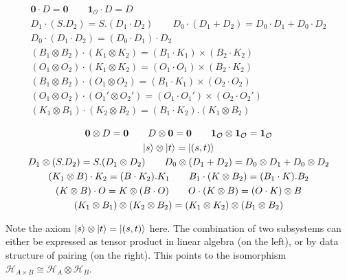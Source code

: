 \documentclass[manuscript, review, timestamp]{acmart}
\begin{document}
\begin{definition}
  \begin{gather*}
      \textbf{0} \cdot D = \textbf{0}
      \qquad
      \textbf{1}_\mathcal{O} \cdot D = D \\
      D_1 \cdot (S.D_2) = S.(D_1 \cdot D_2)
      \qquad
      D_0 \cdot (D_1 + D_2) = D_0 \cdot D_1 + D_0 \cdot D_2 \\
      D_0 \cdot (D_1 \cdot D_2) = (D_0 \cdot D_1) \cdot D_2 \\
      (B_1 \otimes B_2) \cdot (K_1 \otimes K_2) = (B_1 \cdot K_1) \times (B_2 \cdot K_2) \\
      (O_1 \otimes O_2) \cdot (K_1 \otimes K_2) = (O_1 \cdot O_1) \times (B_2 \cdot K_2) \\
      (B_1 \otimes B_2) \cdot (O_1 \otimes O_2) = (B_1 \cdot K_1) \times (O_2 \cdot O_2) \\
      (O_1 \otimes O_2) \cdot (O_1' \otimes O_2') = (O_1 \cdot O_1') \times (O_2 \cdot O_2') \\
      (K_1 \otimes B_1) \cdot (K_2 \otimes B_2) = (B_1 \cdot K_2) . (K_1 \otimes B_2)
  \end{gather*}
\end{definition}


\begin{definition}
  \begin{gather*}
      \mathbf{0} \otimes D = \mathbf{0}
      \qquad
      D \otimes \mathbf{0} = \mathbf{0}
      \qquad
      \mathbf{1}_\mathcal{O} \otimes \mathbf{1}_\mathcal{O} = \mathbf{1}_\mathcal{O} \\
      \ket{s} \otimes \ket{t} =\ket{(s, t)} \\
      D_1 \otimes (S.D_2) = S.(D_1 \otimes D_2)
      \qquad
      D_0 \otimes (D_1 + D_2) = D_0 \otimes D_1 + D_0 \otimes D_2 \\
      (K_1 \otimes B) \cdot K_2 = (B \cdot K_2).K_1
      \qquad
      B_1 \cdot (K \otimes B_2) = (B_1 \cdot K).B_2 \\
      (K \otimes B) \cdot O = K \otimes (B \cdot O)
      \qquad
      O \cdot (K \otimes B) = (O \cdot K) \otimes B \\
      (K_1 \otimes B_1) \otimes (K_2 \otimes B_2) = (K_1 \otimes K_2) \otimes (B_1 \otimes B_2) \\
  \end{gather*}
\end{definition}

Note the axiom $\ket{s} \otimes \ket{t} =\ket{(s, t)}$ here. The combination of two subsystems can either be expressed as tensor product in linear algebra (on the left), or by data structure of pairing (on the right). This points to the isomorphism $\mathcal{H}_{A \times B} \cong \mathcal{H}_A \otimes \mathcal{H}_B$.
\end{document}

